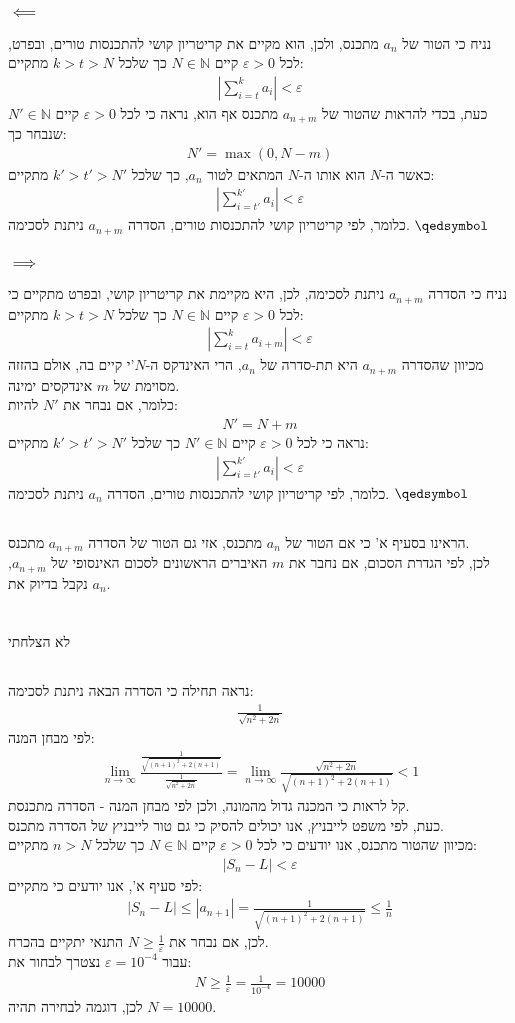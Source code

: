 \documentclass[a4paper, 12pt, leqno]{article}
\newcommand{\sub}[1]{\subsection{\underline{#1}}}
\newcommand{\subsub}[1]{\subsubsection{\underline{#1}}}
\newcommand{\N}{\ensuremath{\mathbb{N}}}
\newcommand{\eq}[1]{\begin{align*}#1\end{align*}}
\newcommand{\limn}{\lim_{n\to\infty}}
\renewcommand{\qed}{\hfill\(\qedsymbol\)}
\renewcommand{\leq}{\leqslant}
\renewcommand{\geq}{\geqslant}
\begin{document}
\section{}
\sub{}
\subsub{$\impliedby$}
נניח כי הטור של $a_n$ מתכנס, ולכן, הוא מקיים את קריטריון קושי להתכנסות טורים, ובפרט, לכל $\varepsilon>0$ קיים $N\in\N$ כך שלכל $k>t>N$ מתקיים:
\eq{
    |\sum_{i=t}^k{a_i}|<\varepsilon
}
כעת, בכדי להראות שהטור של $a_{n+m}$ מתכנס אף הוא, נראה כי לכל $\varepsilon>0$ קיים $N'\in\N$ שנבחר כך:
\eq{
    N'=\max(0,N-m)
}
כאשר ה-$N$ הוא אותו ה-$N$ המתאים לטור $a_n$, כך שלכל $k'>t'>N'$ מתקיים:
\eq{
    |\sum_{i=t'}^{k'}{a_i}|<\varepsilon
}
כלומר, לפי קריטריון קושי להתכנסות טורים, הסדרה $a_{n+m}$ ניתנת לסכימה.
\qed
\subsub{$\implies$}
נניח כי הסדרה $a_{n+m}$ ניתנת לסכימה, לכן, היא מקיימת את קריטריון קושי, ובפרט מתקיים כי לכל $\varepsilon>0$ קיים $N\in\N$ כך שלכל $k>t>N$ מתקיים:
\eq{
    |\sum_{i=t}^{k}{a_{i+m}}|<\varepsilon
}
מכיוון שהסדרה $a_{n+m}$ היא תת-סדרה של $a_n$, הרי האינדקס ה-$N$'י קיים בה, אולם בהזזה מסוימת של $m$ אינדקסים ימינה.\\
כלומר, אם נבחר את $N'$ להיות:
\eq{
    N'=N+m
}
נראה כי לכל $\varepsilon>0$ קיים $N'\in\N$ כך שלכל $k'>t'>N'$ מתקיים:
\eq{
    |\sum_{i=t'}^{k'}{a_{i}}|<\varepsilon
}
כלומר, לפי קריטריון קושי להתכנסות טורים, הסדרה $a_{n}$ ניתנת לסכימה.
\qed
\sub{}
הראינו בסעיף א' כי אם הטור של $a_n$ מתכנס, אזי גם הטור של הסדרה $a_{n+m}$ מתכנס.\\
לכן, לפי הגדרת הסכום, אם נחבר את $m$ האיברים הראשונים לסכום האינסופי של $a_{n+m}$, נקבל בדיוק את $a_n$.
\pagebreak

\section{}
\sub{}
לא הצלחתי
\sub{}
נראה תחילה כי הסדרה הבאה ניתנת לסכימה:
\eq{
    \frac{1}{\sqrt{n^2+2n}}
}
לפי מבחן המנה:
\eq{
    \limn{\frac
    {\frac{1}{\sqrt{(n+1)^2+2(n+1)}}}
    {\frac{1}{\sqrt{n^2+2n}}}}
    =\limn\frac{\sqrt{n^2+2n}}{\sqrt{(n+1)^2+2(n+1)}}<1
}
קל לראות כי המכנה גדול מהמונה, ולכן לפי מבחן המנה - הסדרה מתכנסת.\\
כעת, לפי משפט לייבניץ, אנו יכולים להסיק כי גם טור לייבניץ של הסדרה מתכנס.\\
מכיוון שהטור מתכנס, אנו יודעים כי לכל $\varepsilon>0$ קיים $N\in\N$ כך שלכל $n>N$ מתקיים:
\eq{
    |S_n-L|<\varepsilon
}
לפי סעיף א', אנו יודעים כי מתקיים:
\eq{
    |S_n-L|\leq|a_{n+1}|=\frac{1}{\sqrt{(n+1)^2+2(n+1)}}\leq\frac{1}{n}
}
לכן, אם נבחר את $N\geq\frac{1}{\varepsilon}$ התנאי יתקיים בהכרח.\\
עבור $\varepsilon=10^{-4}$ נצטרך לבחור את:
\eq{
    N\geq\frac{1}{\varepsilon}=\frac{1}{10^{-4}}=10000
}
לכן, דוגמה לבחירה תהיה $N=10000$.


\end{document}
